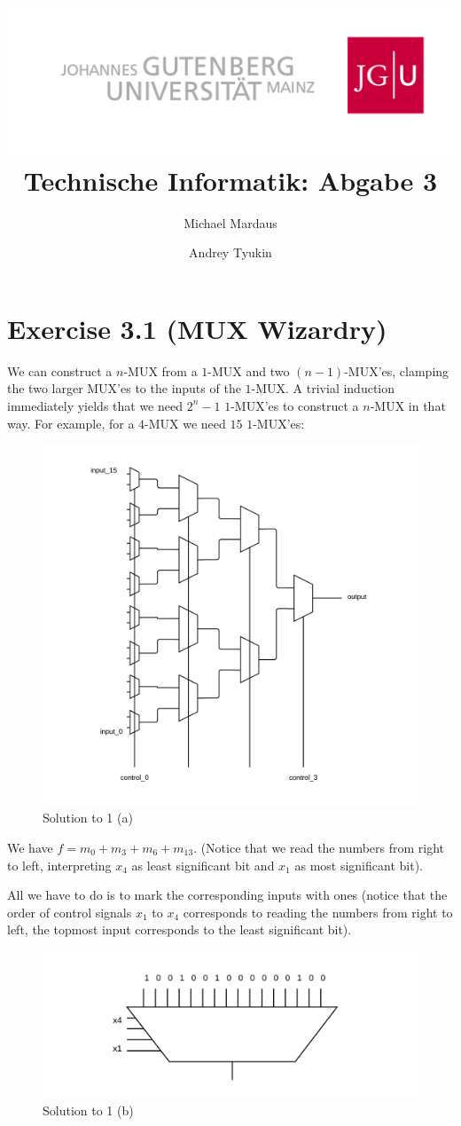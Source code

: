 \documentclass[10pt,a4paper]{scrartcl}
\author{Michael Mardaus \and Andrey Tyukin}
\title{\includegraphics[scale=0.2]{../logo_schriftzug}\\
Technische Informatik: Abgabe 3}
\newcommand{\subExercise}[1]{\vspace{1em} \noindent{\bf #1)}}
\begin{document}
\maketitle

\section*{Exercise 3.1 (MUX Wizardry)}

\subExercise{a}  
We can construct a $n$-MUX from a $1$-MUX and 
two $(n-1)$-MUX'es, clamping the two larger MUX'es to the inputs of the $1$-MUX. 
A trivial induction immediately yields that we need $2^n - 1$ $1$-MUX'es 
to construct a $n$-MUX in that way. For example, for a $4$-MUX we need $15$ 
$1$-MUX'es:

\vspace{1em}
\begin{figure}[h]
  \centering\includegraphics[width=0.6\linewidth]{images/mux4FromMux1.png}
  \caption{Solution to 1 (a)}
\end{figure}
\vspace{1em}

\subExercise{b}
We have $f = m_0 + m_3 + m_6 + m_{13}$. 
(Notice that we read the numbers from right to left, interpreting $x_4$ as least 
significant bit and $x_1$ as most significant bit).

All we have to do is to mark the corresponding inputs with ones (notice that
the order of control signals $x_1$ to $x_4$ corresponds to reading the numbers 
from right to left, the topmost input corresponds to the least significant bit).
\vspace{1em}
\begin{figure}[h]
  \centering\includegraphics[width=0.7\linewidth]{images/tiExercise3-1-b.png}
  \caption{Solution to 1 (b)}
\end{figure}
\vspace{1em}
\end{document}
